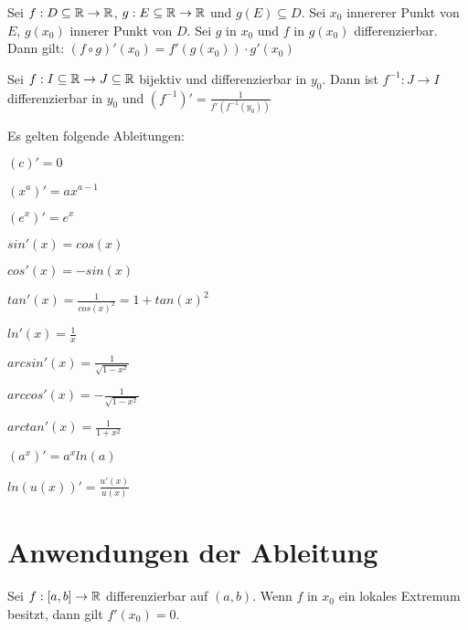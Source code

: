 \begin{satz}[Kettenregel]
	Sei $f :  D \subseteq \mathbb{R} \rightarrow \mathbb{R}$, $g : E \subseteq \mathbb{R} \rightarrow \mathbb{R}$ und $g(E) \subseteq D$. Sei $x_0$ innererer Punkt von $E$, $g(x_0)$ innerer Punkt von $D$. Sei $g$ in $x_0$ und $f$ in $g(x_0)$ differenzierbar. Dann gilt: $(f \circ g)'(x_0) = f'(g(x_0)) \cdot g'(x_0)$
 \end{satz}

\begin{satz}
	Sei $f : I \subseteq \mathbb{R} \rightarrow J \subseteq \mathbb{R} $ bijektiv und differenzierbar in $y_0$. Dann ist $f^{-1} : J \rightarrow I$ differenzierbar in $y_0$ und $(f^{-1})'=\frac{1}{f'(f^{-1}(y_0))}$
\end{satz}



\begin{satz}
	Es gelten folgende Ableitungen:
	\begin{multicols}{2}
		\begin{description}[noitemsep]
			\item $(c)' = 0$
			\item $(x^a)'=ax^{a-1}$
			\item $(e^x)'=e^x$
			\item $sin'(x) = cos(x)$
			\item $cos'(x) = -sin(x)$
			\item $tan'(x) = \frac{1}{cos(x)^2} = 1 + tan(x)^2$
			\item $ln'(x) = \frac{1}{x}$
			\item $arcsin'(x) = \frac{1}{\sqrt{1 -x^2}}$	
			\item $arccos'(x) = - \frac{1}{\sqrt{1 - x^2}}$	
			\item $arctan'(x) = \frac{1}{1 + x^2}$
			\item $(a^x)' = a^x ln(a)$
			\item $ln(u(x))'=\frac{u'(x)}{u(x)}$
		\end{description}
	\end{multicols}
\end{satz}

\section{Anwendungen der Ableitung}

\begin{satz}
	Sei $f : [a,b] \rightarrow \mathbb{R}$ differenzierbar auf $(a,b)$. Wenn $f$ in $x_0$ ein lokales Extremum besitzt, dann gilt $f'(x_0) = 0$.
\end{satz}

